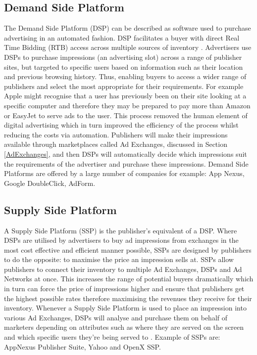 \documentclass[12pt]{article}
\begin{document}
\subsection{Demand Side Platform} \label{DSP}
The Demand Side Platform (DSP) can be described as software used to purchase advertising in an automated fashion. DSP facilitates a buyer with direct Real Time Bidding (RTB) access across multiple sources of inventory \parencite{introDSP}. Advertisers use DSPs to purchase impressions (an advertising slot) across a range of publisher sites, but targeted to specific users based on information such as their location and previous browsing history. Thus, enabling buyers to access a wider range of publishers and select the most appropriate for their requirements. For example Apple might recognise that a user has previously been on their site looking at a specific computer and therefore they may be prepared to pay more than Amazon or EasyJet to serve ads to the user. This process removed the human element of digital advertising which in turn improved the efficiency of the process whilst reducing the costs via automation. Publishers will make their impressions available through marketplaces called Ad Exchanges, discussed in Section \ref{AdExchanges}, and then DSPs will automatically decide which impressions suit the requirements of the advertiser and purchase these impressions. Demand Side Platforms are offered by a large number of companies for example: App Nexus, Google DoubleClick, AdForm. 

\subsection{Supply Side Platform} \label{SSP}
A Supply Side Platform (SSP) is the publisher's equivalent of a DSP. Where DSPs are utilised by advertisers to buy ad impressions from exchanges in the most cost effective and efficient manner possible, SSPs are designed by publishers to do the opposite: to maximise the price an impression sells at. SSPs allow publishers to connect their inventory to multiple Ad Exchanges, DSPs and Ad Networks at once. This increases the range of potential buyers dramatically which in turn can force the price of impressions higher and ensure that publishers get the highest possible rates therefore maximising the revenues they receive for their inventory. Whenever a Supply Side Platform is used to place an impression into various Ad Exchanges, DSPs will analyse and purchase them on behalf of marketers depending on attributes such as where they are served on the screen and which specific users they're being served to \parencite{introDSP}. Example of SSPs are: AppNexus Publisher Suite, Yahoo and OpenX SSP.  
\end{document}
